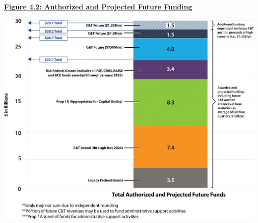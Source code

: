 \centering\textbf{\underline{Figure 4.2: Authorized and Projected Future Funding \citep{ureport2025}}} \par
\noindent 
\vspace*{1em}
\includegraphics[width=\linewidth]{./attachments/fundalloc}
\justifying\par